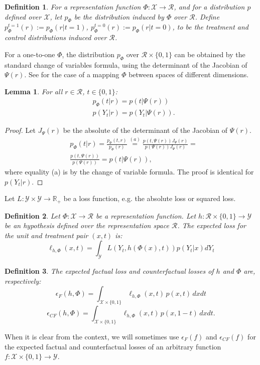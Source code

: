 \documentclass{article}
\newtheorem{thmappdef}{Definition}
\newtheorem{thmapplem}{Lemma}
\def\cX{\mathcal X}
\def\cY{\mathcal Y}
\def\cR{\mathcal{R}}
\def \R{\mathbb{R}}
\newcommand{\pc}{p^{t=0}}
\newcommand{\pt}{p^{t=1}}
\newcommand{\lyth}{\ell_{h,\Phi}(x,t)}
\begin{document}
\begin{thmappdef}\label{def:pphiA}
For a representation function $\Phi :\cX \rightarrow \cR$, and for a distribution $p$ defined over $\cX$, let $p_\Phi$ be the distribution induced by $\Phi$ over $\cR$. Define $\pt_\Phi(r) := p_\Phi(r|t=1)$, $\pc_\Phi(r) := p_\Phi(r|t=0)$, to be the treatment and control distributions induced over $\cR$.
\end{thmappdef}


For a one-to-one $\Phi$, the distribution $p_\Phi$ over $\cR \times \{0,1\}$ can be obtained by the standard change of variables formula, using the determinant of the Jacobian of $\Psi(r)$. See \cite{ben1999change} for the case of a mapping $\Phi$ between spaces of different dimensions.



\begin{thmapplem}\label{lemma:smpl_alg3}
For all $r \in \cR$, $t \in \{0,1\}$:
\begin{align*}
&p_\Phi(t|r) = p(t|\Psi(r))\\
& p(Y_t|r) = p(Y_t|\Psi(r)).
\end{align*}
\end{thmapplem}
\begin{proof}
Let $J_\Psi(r)$ be the absolute of the determinant of the Jacobian of $\Psi(r)$.
\begin{align*}
&p_\Phi(t|r) = \frac{p_\Phi(t,r)}{p_\Phi(r)}  \stackrel{(a)}{=}
\frac{p(t,\Psi(r))J_\Psi(r)}{p(\Psi(r)) J_\Psi(r)} = \\
&\frac{p(t,\Psi(r))}{p(\Psi(r))} = p(t|\Psi(r)),
\end{align*}
where equality (a) is by the change of variable formula. The proof is identical for $p(Y_t|r)$.
\end{proof}






Let $L : \cY \times \cY \rightarrow \R_+$ be a loss function, e.g. the absolute loss or squared loss.
\begin{thmappdef}\label{def:perunitlossA}
Let $\Phi : \cX \rightarrow \cR$ be a representation function.
Let $h :\cR \times \{0,1\} \rightarrow \cY$ be an hypothesis defined over the representation space $\cR$.
The expected loss for the unit and treatment pair $(x,t)$ is:
$$\lyth = \int_\cY L(Y_t,h(\Phi(x),t)) p(Y_t|x) dY_t$$
\end{thmappdef}

\begin{thmappdef}\label{def:epfepcf}
The expected factual loss and counterfactual losses of $h$ and $\Phi$ are, respectively:
$$\epsilon_F(h,\Phi) = \int_{\cX \times \{0,1\}} \!\!\!\!\!\!\! \lyth\, p(x,t)\, dxdt $$
$$\epsilon_{CF}(h,\Phi) = \int_{\cX \times \{0,1\}} \!\!\!\!\!\!\! \lyth\, p(x,1-t)\, dxdt .$$
\end{thmappdef}
When it is clear from the context, we will sometimes use $\epsilon_F(f)$ and $\epsilon_{CF}(f)$ for the expected factual and counterfactual losses of an arbitrary function $f: \cX \times \{0,1\} \rightarrow \cY$.
\end{document}
